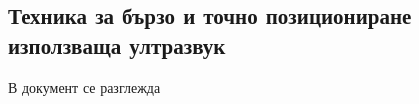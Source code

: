 \subsection{Техника за бързо и точно позициониране използваща ултразвук}

В документ \cite{fastAndAccurate} се разглежда 